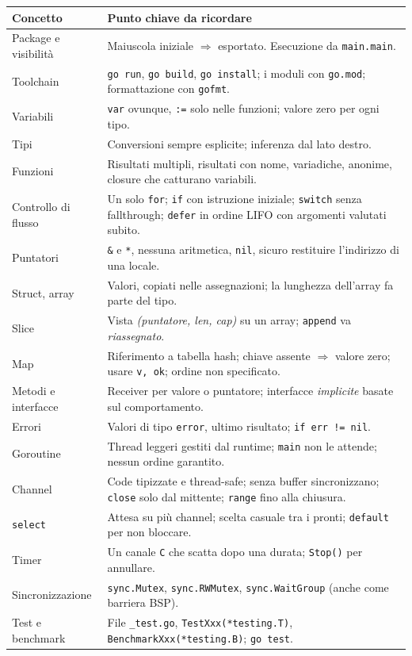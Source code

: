 \documentclass[11pt,a4paper]{report}
\newcommand{\cod}[1]{\texttt{#1}}
\begin{document}
\begin{center}
\small
\renewcommand{\arraystretch}{1.25}
\begin{tabular}{@{}p{}p{}@{}}
\toprule
\textbf{Concetto} & \textbf{Punto chiave da ricordare}\\
\midrule
Package e visibilità & Maiuscola iniziale $\Rightarrow$ esportato. Esecuzione da \cod{main.main}.\\
Toolchain & \cod{go run}, \cod{go build}, \cod{go install}; i moduli con \cod{go.mod}; formattazione con \cod{gofmt}.\\
Variabili & \cod{var} ovunque, \cod{:=} solo nelle funzioni; valore zero per ogni tipo.\\
Tipi & Conversioni sempre esplicite; inferenza dal lato destro.\\
Funzioni & Risultati multipli, risultati con nome, variadiche, anonime, closure che catturano variabili.\\
Controllo di flusso & Un solo \cod{for}; \cod{if} con istruzione iniziale; \cod{switch} senza fallthrough; \cod{defer} in ordine LIFO con argomenti valutati subito.\\
Puntatori & \cod{\&} e \cod{*}, nessuna aritmetica, \cod{nil}, sicuro restituire l'indirizzo di una locale.\\
Struct, array & Valori, copiati nelle assegnazioni; la lunghezza dell'array fa parte del tipo.\\
Slice & Vista \emph{(puntatore, len, cap)} su un array; \cod{append} va \emph{riassegnato}.\\
Map & Riferimento a tabella hash; chiave assente $\Rightarrow$ valore zero; usare \cod{v, ok}; ordine non specificato.\\
Metodi e interfacce & Receiver per valore o puntatore; interfacce \emph{implicite} basate sul comportamento.\\
Errori & Valori di tipo \cod{error}, ultimo risultato; \cod{if err != nil}.\\
Goroutine & Thread leggeri gestiti dal runtime; \cod{main} non le attende; nessun ordine garantito.\\
Channel & Code tipizzate e thread-safe; senza buffer sincronizzano; \cod{close} solo dal mittente; \cod{range} fino alla chiusura.\\
\cod{select} & Attesa su più channel; scelta casuale tra i pronti; \cod{default} per non bloccare.\\
Timer & Un canale \cod{C} che scatta dopo una durata; \cod{Stop()} per annullare.\\
Sincronizzazione & \cod{sync.Mutex}, \cod{sync.RWMutex}, \cod{sync.WaitGroup} (anche come barriera BSP).\\
Test e benchmark & File \texttt{\_test.go}, \cod{TestXxx(*testing.T)}, \cod{BenchmarkXxx(*testing.B)}; \cod{go test}.\\
\bottomrule
\end{tabular}
\end{center}
\end{document}
